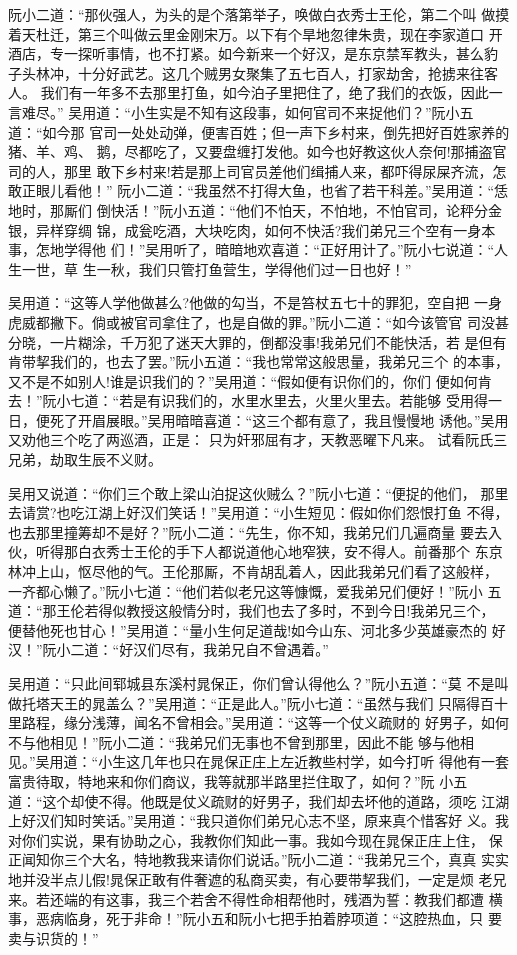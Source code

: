 阮小二道：“那伙强人，为头的是个落第举子，唤做白衣秀士王伦，第二个叫
做摸着天杜迁，第三个叫做云里金刚宋万。以下有个旱地忽律朱贵，现在李家道口
开酒店，专一探听事情，也不打紧。如今新来一个好汉，是东京禁军教头，甚么豹
子头林冲，十分好武艺。这几个贼男女聚集了五七百人，打家劫舍，抢掳来往客人。
我们有一年多不去那里打鱼，如今泊子里把住了，绝了我们的衣饭，因此一言难尽。”
吴用道：“小生实是不知有这段事，如何官司不来捉他们？”阮小五道：“如今那
官司一处处动弹，便害百姓；但一声下乡村来，倒先把好百姓家养的猪、羊、鸡、
鹅，尽都吃了，又要盘缠打发他。如今也好教这伙人奈何!那捕盗官司的人，那里
敢下乡村来!若是那上司官员差他们缉捕人来，都吓得尿屎齐流，怎敢正眼儿看他！”
阮小二道：“我虽然不打得大鱼，也省了若干科差。”吴用道：“恁地时，那厮们
倒快活！”阮小五道：“他们不怕天，不怕地，不怕官司，论秤分金银，异样穿绸
锦，成瓮吃酒，大块吃肉，如何不快活?我们弟兄三个空有一身本事，怎地学得他
们！”吴用听了，暗暗地欢喜道：“正好用计了。”阮小七说道：“人生一世，草
生一秋，我们只管打鱼营生，学得他们过一日也好！”

吴用道：“这等人学他做甚么?他做的勾当，不是笞杖五七十的罪犯，空自把
一身虎威都撇下。倘或被官司拿住了，也是自做的罪。”阮小二道：“如今该管官
司没甚分晓，一片糊涂，千万犯了迷天大罪的，倒都没事!我弟兄们不能快活，若
是但有肯带挈我们的，也去了罢。”阮小五道：“我也常常这般思量，我弟兄三个
的本事，又不是不如别人!谁是识我们的？”吴用道：“假如便有识你们的，你们
便如何肯去！”阮小七道：“若是有识我们的，水里水里去，火里火里去。若能够
受用得一日，便死了开眉展眼。”吴用暗暗喜道：“这三个都有意了，我且慢慢地
诱他。”吴用又劝他三个吃了两巡酒，正是：
只为奸邪屈有才，天教恶曜下凡来。
试看阮氏三兄弟，劫取生辰不义财。

吴用又说道：“你们三个敢上梁山泊捉这伙贼么？”阮小七道：“便捉的他们，
那里去请赏?也吃江湖上好汉们笑话！”吴用道：“小生短见：假如你们怨恨打鱼
不得，也去那里撞筹却不是好？”阮小二道：“先生，你不知，我弟兄们几遍商量
要去入伙，听得那白衣秀士王伦的手下人都说道他心地窄狭，安不得人。前番那个
东京林冲上山，怄尽他的气。王伦那厮，不肯胡乱着人，因此我弟兄们看了这般样，
一齐都心懒了。”阮小七道：“他们若似老兄这等慷慨，爱我弟兄们便好！”阮小
五道：“那王伦若得似教授这般情分时，我们也去了多时，不到今日!我弟兄三个，
便替他死也甘心！”吴用道：“量小生何足道哉!如今山东、河北多少英雄豪杰的
好汉！”阮小二道：“好汉们尽有，我弟兄自不曾遇着。”

吴用道：“只此间郓城县东溪村晁保正，你们曾认得他么？”阮小五道：“莫
不是叫做托塔天王的晁盖么？”吴用道：“正是此人。”阮小七道：“虽然与我们
只隔得百十里路程，缘分浅薄，闻名不曾相会。”吴用道：“这等一个仗义疏财的
好男子，如何不与他相见！”阮小二道：“我弟兄们无事也不曾到那里，因此不能
够与他相见。”吴用道：“小生这几年也只在晁保正庄上左近教些村学，如今打听
得他有一套富贵待取，特地来和你们商议，我等就那半路里拦住取了，如何？”阮
小五道：“这个却使不得。他既是仗义疏财的好男子，我们却去坏他的道路，须吃
江湖上好汉们知时笑话。”吴用道：“我只道你们弟兄心志不坚，原来真个惜客好
义。我对你们实说，果有协助之心，我教你们知此一事。我如今现在晁保正庄上住，
保正闻知你三个大名，特地教我来请你们说话。”阮小二道：“我弟兄三个，真真
实实地并没半点儿假!晁保正敢有件奢遮的私商买卖，有心要带挈我们，一定是烦
老兄来。若还端的有这事，我三个若舍不得性命相帮他时，残酒为誓：教我们都遭
横事，恶病临身，死于非命！”阮小五和阮小七把手拍着脖项道：“这腔热血，只
要卖与识货的！”

